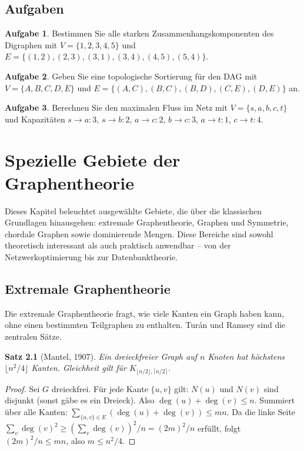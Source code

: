 ﻿\documentclass[a4paper,12pt,openany,oneside]{book}
\theoremstyle{definition}
\newtheorem{aufgabe}{Aufgabe}[chapter]
\theoremstyle{plain}
\newtheorem{satz}{Satz}[chapter]
\theoremstyle{remark}
\begin{document}
\section{Aufgaben}

\begin{aufgabe}
  Bestimmen Sie alle starken Zusammenhangskomponenten des Digraphen mit
  $V = \{1,2,3,4,5\}$ und $E = \{(1,2),(2,3),(3,1),(3,4),(4,5),(5,4)\}$.
\end{aufgabe}

\begin{aufgabe}
  Geben Sie eine topologische Sortierung f\"ur den DAG mit
  $V = \{A,B,C,D,E\}$ und $E = \{(A,C),(B,C),(B,D),(C,E),(D,E)\}$ an.
\end{aufgabe}

\begin{aufgabe}
  Berechnen Sie den maximalen Fluss im Netz mit $V = \{s,a,b,c,t\}$
  und Kapazit\"aten $s{\to}a{:}3$, $s{\to}b{:}2$, $a{\to}c{:}2$,
  $b{\to}c{:}3$, $a{\to}t{:}1$, $c{\to}t{:}4$.
\end{aufgabe}
\chapter{Spezielle Gebiete der Graphentheorie}

Dieses Kapitel beleuchtet ausgew\"ahlte Gebiete, die \"uber die klassischen
Grundlagen hinausgehen: extremale Graphentheorie, Graphen und Symmetrie,
chordale Graphen sowie dominierende Mengen. Diese Bereiche sind sowohl
theoretisch interessant als auch praktisch anwendbar -- von der
Netzwerkoptimierung bis zur Datenbanktheorie.

\section{Extremale Graphentheorie}

Die extremale Graphentheorie fragt, wie viele Kanten ein Graph haben kann,
ohne einen bestimmten Teilgraphen zu enthalten. Tur\'an und Ramsey sind die
zentralen S\"atze.

\begin{satz}[Mantel, 1907]
  Ein dreieckfreier Graph auf $n$ Knoten hat h\"ochstens
  $\lfloor n^2/4 \rfloor$ Kanten. Gleichheit gilt f\"ur $K_{\lfloor n/2
  \rfloor, \lceil n/2 \rceil}$.
\end{satz}

\begin{proof}
  Sei $G$ dreieckfrei. F\"ur jede Kante $\{u,v\}$ gilt: $N(u)$ und $N(v)$
  sind disjunkt (sonst g\"abe es ein Dreieck). Also
  $\deg(u) + \deg(v) \leq n$.
  Summiert \"uber alle Kanten:
  $\sum_{\{u,v\}\in E}(\deg(u)+\deg(v)) \leq mn$.
  Da die linke Seite $\sum_v \deg(v)^2 \geq (\sum_v \deg(v))^2/n
  = (2m)^2/n$ erf\"ullt, folgt $(2m)^2/n \leq mn$, also
  $m \leq n^2/4$.
\end{proof}
\end{document}

